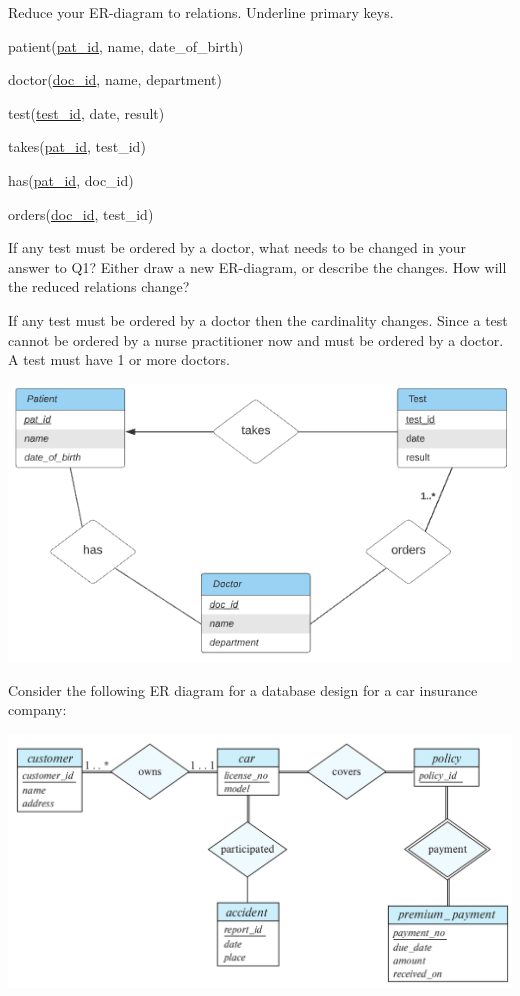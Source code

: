 \documentclass[a4 paper]{article}
\begin{document}
Reduce your ER-diagram to relations. Underline primary keys.

patient(\underline{pat\_id}, name, date\_of\_birth)

doctor(\underline{doc\_id}, name, department)

test(\underline{test\_id}, date, result)

takes(\underline{pat\_id}, test\_id)

has(\underline{pat\_id}, doc\_id)

orders(\underline{doc\_id}, test\_id)

If any test must be ordered by a doctor, what needs to be changed in your answer to Q1? Either draw a new ER-diagram, or describe the changes. How will the reduced relations change?

If any test must be ordered by a doctor then the cardinality changes. Since a test cannot be ordered by a nurse practitioner now and must be ordered by a doctor.
A test must have 1 or more doctors.

\includegraphics[width=\textwidth]{er3.png}

Consider the following ER diagram for a database design for a car insurance company:

\includegraphics[width=\textwidth]{er2.png}
\end{document}
